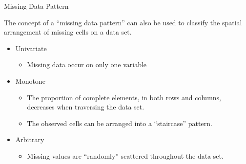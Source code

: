 \documentclass{beamer}\usepackage[]{graphicx}\usepackage[]{color}
\begin{document}

\begin{frame}{Missing Data Pattern}

 The concept of a ``missing data pattern'' can also be used to classify the
  spatial arrangement of missing cells on a data set.\\

  \vc

  \begin{itemize}
  \item Univariate
    \begin{itemize}
      \item Missing data occur on only one variable
    \end{itemize}

    \vb

  \item Monotone
    \begin{itemize}
    \item The proportion of complete elements, in both rows and columns,
      decreases when traversing the data set.
    \item The observed cells can be arranged into a ``staircase'' pattern.
    \end{itemize}

    \vb

  \item Arbitrary
    \begin{itemize}
    \item Missing values are ``randomly'' scattered throughout the data set.
    \end{itemize}
  \end{itemize}

\end{frame}

\watermarkoff %
\end{document}
